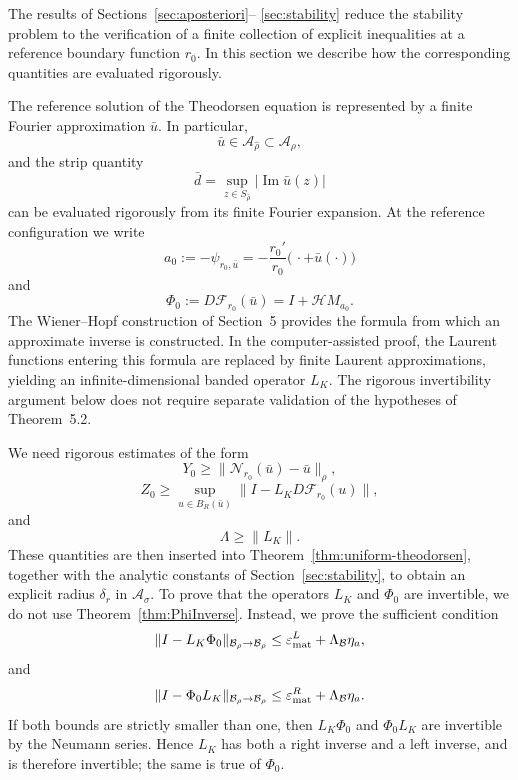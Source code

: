 \documentclass[11pt,a4paper]{amsart}
\begin{document}
The results of Sections~\ref{sec:aposteriori}--
\ref{sec:stability} reduce the stability problem to the verification
of a finite collection of explicit inequalities at a reference
boundary function $r_0$. In this section we describe how the
corresponding quantities are evaluated rigorously.

The reference solution of the Theodorsen equation is represented by a finite Fourier
approximation $\bar u$. In particular,
\[
\bar u\in\mathcal A_{\widehat\rho}
\subset\mathcal A_\rho,
\]
and the strip quantity
\[
\bar d
=
\sup_{z\in S_{\widehat\rho}}
|\operatorname{Im}\bar u(z)|
\]
can be evaluated rigorously from its finite Fourier expansion. At the reference configuration we write
\[
a_0:=-\psi_{r_0,\bar u}=-\frac{r_0'}{r_0}\bigl(\,\cdot+\bar u(\cdot)\bigr)
\]
and
\[
\Phi_0
:=
D\mathcal F_{r_0}(\bar u)
=
I+\mathcal H M_{a_0}.
\]
The Wiener--Hopf construction of Section~5 provides the formula from which an approximate inverse is constructed. In the computer-assisted proof, the Laurent functions entering this formula are replaced by finite Laurent approximations, yielding an infinite-dimensional banded operator \(L_K\). The rigorous invertibility argument below does not require separate validation of the hypotheses of Theorem~5.2.

We need rigorous estimates of the form
\begin{equation}\label{eq:reference-Y}
	Y_0
	\ge
	\|\mathcal N_{r_0}(\bar u)-\bar u\|_\rho,
\end{equation}
\begin{equation}\label{eq:reference-Z}
	Z_0
	\ge
	\sup_{u\in B_R(\bar u)}
	\|I-L_KD\mathcal F_{r_0}(u)\|,
\end{equation}
and
\begin{equation}\label{eq:reference-L}
	\Lambda
	\ge
	\|L_K\|.
\end{equation}
These quantities are then inserted into
Theorem~\ref{thm:uniform-theodorsen}, together with the analytic
constants of Section~\ref{sec:stability}, to obtain an explicit
radius $\delta_r$ in $\mathcal A_\sigma$.
To prove that the operators $L_K$ and $\Phi_0$ are invertible, we do not use  Theorem~\ref{thm:PhiInverse}. Instead, we prove the sufficient condition 
\[
\|I-L_K\Phi_0\|_{\mathcal B_\rho\to\mathcal B_\rho}
\le
\varepsilon_{\rm mat}^{L}+\Lambda_{\mathcal B}\eta_a,
\]
and
\[
\|I-\Phi_0L_K\|_{\mathcal B_\rho\to\mathcal B_\rho}
\le
\varepsilon_{\rm mat}^{R}+\Lambda_{\mathcal B}\eta_a.
\]
If both bounds are strictly smaller than one, then
$L_K\Phi_0$ and $\Phi_0L_K$ are invertible by the Neumann series.
Hence $L_K$ has both a right inverse and a left inverse, and is
therefore invertible; the same is true of $\Phi_0$.
\end{document}
